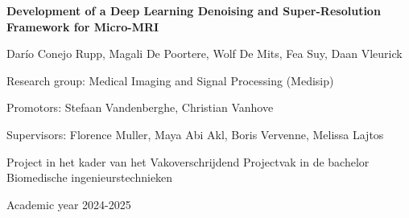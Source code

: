 \documentclass[twocolumn]{article}
\begin{document}
\begin{titlepage}
    \centering
    \vspace*{\fill}
    
    {\LARGE \textbf{Development of a Deep Learning Denoising and Super-Resolution Framework for Micro-MRI} \par}
    \vspace{0.5cm}

    {\Large Darío Conejo Rupp, Magali De Poortere, Wolf De Mits, Fea Suy, Daan Vleurick \par}
    \vspace{2cm}

    {\large Research group: Medical Imaging and Signal Processing (Medisip) \par}
    \vspace{0.2cm}

    {\large Promotors: Stefaan Vandenberghe, Christian Vanhove \par}
    \vspace{0.2cm}

    {\large Supervisors: Florence Muller, Maya Abi Akl, Boris Vervenne, Melissa Lajtos \par}

    \vspace{2cm}

    {\large {Project in het kader van het Vakoverschrijdend Projectvak in de bachelor Biomedische ingenieurstechnieken} \par}
    {\large {Academic year 2024-2025} \par}

    \vspace*{\fill}
\end{titlepage}
\end{document}
